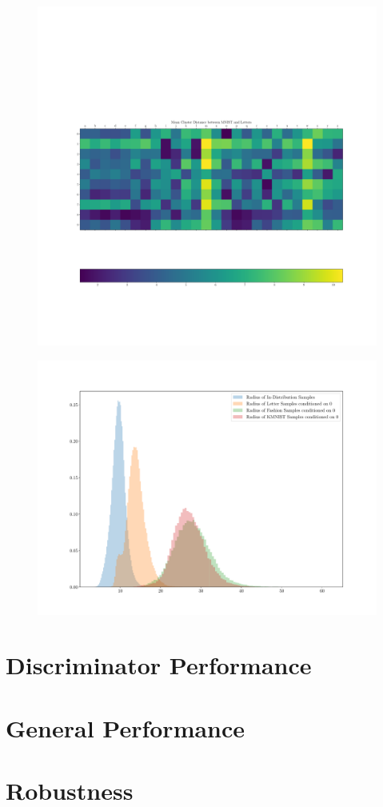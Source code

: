 \begin{figure}[htpb]
    \centering
    \includegraphics[width=0.8\linewidth]{figures/samples/emnist_distance_matrix_letters.pdf}
    \caption{}%
    \label{fig:}
\end{figure}

\begin{figure}[htpb]
    \centering
    \includegraphics[width=0.8\linewidth]{figures/samples/emnist_radius_hist.pdf}
    \caption{}%
    \label{fig:}
\end{figure}


\section{Discriminator Performance}%
\label{sec:discriminator_performance}


\section{General Performance}%
\label{sec:general_performance}


\section{Robustness}%
\label{sec:robustness}


